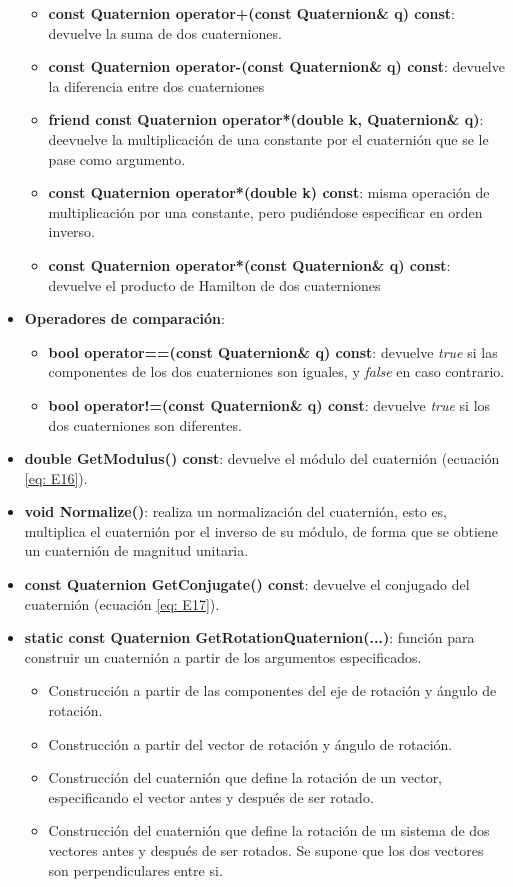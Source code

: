 \documentclass[12pt, a4paper]{report}
\begin{document}
\begin{itemize}
\begin{itemize}
\item \textbf{const Quaternion operator+(const Quaternion\& q) const}: devuelve la suma de dos cuaterniones.
\item \textbf{const Quaternion operator-(const Quaternion\& q) const}: devuelve la diferencia entre dos cuaterniones
\item \textbf{friend const Quaternion operator*(double k, Quaternion\& q)}: deevuelve la multiplicación de una constante por el cuaternión que se le pase como argumento.
\item \textbf{const Quaternion operator*(double k) const}: misma operación de multiplicación por una constante, pero pudiéndose especificar en orden inverso.
\item \textbf{const Quaternion operator*(const Quaternion\& q) const}: devuelve el producto de Hamilton de dos cuaterniones 
\end{itemize}

\item \textbf{Operadores de comparación}:

\begin{itemize}
\item \textbf{bool operator==(const Quaternion\& q) const}: devuelve \textit{true} si las componentes de los dos cuaterniones son iguales, y \textit{false} en caso contrario.
\item \textbf{bool operator!=(const Quaternion\& q) const}: devuelve \textit{true} si los dos cuaterniones son diferentes. 
\end{itemize}

\item \textbf{double GetModulus() const}: devuelve el módulo del cuaternión (ecuación \eqref{eq: E16}).
\item \textbf{void Normalize()}: realiza un normalización del cuaternión, esto es, multiplica el cuaternión por el inverso de su módulo, de forma que se obtiene un cuaternión de magnitud unitaria.
\item \textbf{const Quaternion GetConjugate() const}: devuelve el conjugado del cuaternión (ecuación \eqref{eq: E17}).
\item \textbf{static const Quaternion GetRotationQuaternion(...)}: función para construir un cuaternión a partir de los argumentos especificados. 

	\begin{itemize}
	\item Construcción a partir de las componentes del eje de rotación y ángulo de rotación.
	\item Construcción a partir del vector de rotación y ángulo de rotación.
	\item Construcción del cuaternión que define la rotación de un vector, especificando el vector antes y después de ser rotado.
	\item Construcción del cuaternión que define la rotación de un sistema de dos vectores antes y después de ser rotados. Se supone que los dos vectores son perpendiculares entre si.
	\end{itemize}


\end{itemize}
\end{document}
